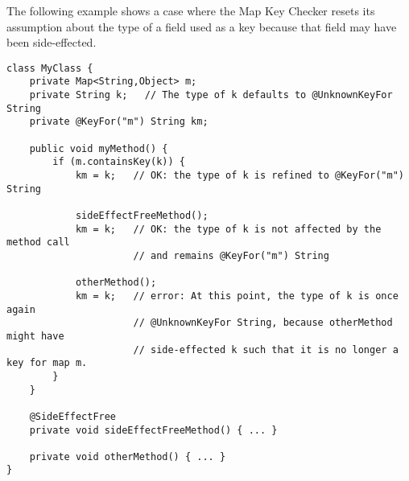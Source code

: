 The following example shows a case where the Map Key Checker resets its
assumption about the type of a field used as a key because that field may have
been side-effected.

\begin{verbatim}
class MyClass {
    private Map<String,Object> m;
    private String k;   // The type of k defaults to @UnknownKeyFor String
    private @KeyFor("m") String km;

    public void myMethod() {
        if (m.containsKey(k)) {
            km = k;   // OK: the type of k is refined to @KeyFor("m") String

            sideEffectFreeMethod();
            km = k;   // OK: the type of k is not affected by the method call
                      // and remains @KeyFor("m") String

            otherMethod();
            km = k;   // error: At this point, the type of k is once again
                      // @UnknownKeyFor String, because otherMethod might have
                      // side-effected k such that it is no longer a key for map m.
        }
    }

    @SideEffectFree
    private void sideEffectFreeMethod() { ... }

    private void otherMethod() { ... }
}
\end{verbatim}


